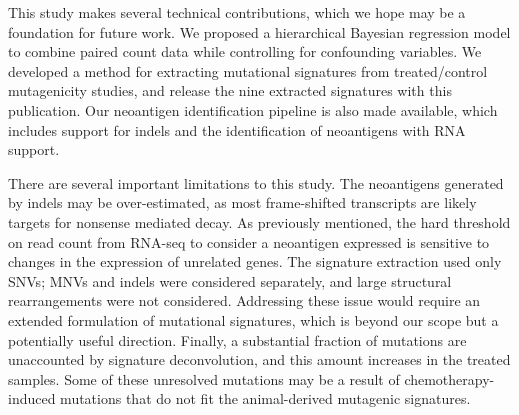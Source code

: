 This study makes several technical contributions, which we hope may be a foundation for future work. We proposed a hierarchical Bayesian regression model to combine paired count data while controlling for confounding variables. We developed a method for extracting mutational signatures from treated/control mutagenicity studies, and release the nine extracted signatures with this publication. Our neoantigen identification pipeline is also made available, which includes support for indels and the identification of neoantigens with RNA support. 

There are several important limitations to this study. The neoantigens generated by indels may be over-estimated, as most frame-shifted transcripts are likely targets for nonsense mediated decay. As previously mentioned, the hard threshold on read count from RNA-seq to consider a neoantigen expressed is sensitive to changes in the expression of unrelated genes. The signature extraction used only SNVs; MNVs and indels were considered separately, and large structural rearrangements were not considered. Addressing these issue would require an extended formulation of mutational signatures, which is beyond our scope but a potentially useful direction. Finally, a substantial fraction of mutations are unaccounted by signature deconvolution, and this amount increases in the treated samples. Some of these unresolved mutations may be a result of chemotherapy-induced mutations that do not fit the animal-derived mutagenic signatures. 



